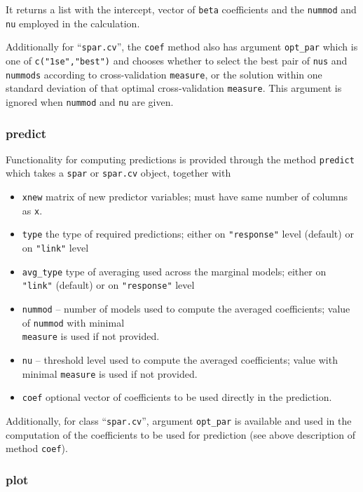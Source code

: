 \documentclass[
  article]{jss}
\begin{document}
It returns a list with the intercept, vector of \texttt{beta}
coefficients and the \texttt{nummod} and \texttt{nu} employed in the
calculation.

Additionally for ``\texttt{spar.cv}'', the \texttt{coef} method also has
argument \texttt{opt\_par} which is one of \texttt{c("1se","best")} and
chooses whether to select the best pair of \texttt{nus} and
\texttt{nummods} according to cross-validation \texttt{measure}, or the
solution within one standard deviation of that optimal cross-validation
\texttt{measure}. This argument is ignored when \texttt{nummod} and
\texttt{nu} are given.

\subsubsection{predict}\label{predict}

Functionality for computing predictions is provided through the method
\texttt{predict} which takes a \texttt{spar} or \texttt{spar.cv} object,
together with

\begin{itemize}
\item
  \texttt{xnew} matrix of new predictor variables; must have same number
  of columns as \texttt{x}.
\item
  \texttt{type} the type of required predictions; either on
  \texttt{"response"} level (default) or on \texttt{"link"} level
\item
  \texttt{avg\_type} type of averaging used across the marginal models;
  either on \texttt{"link"} (default) or on \texttt{"response"} level
\item
  \texttt{nummod} -- number of models used to compute the averaged
  coefficients; value of \texttt{nummod} with minimal\\
  \texttt{measure} is used if not provided.
\item
  \texttt{nu} -- threshold level used to compute the averaged
  coefficients; value with minimal \texttt{measure} is used if not
  provided.
\item
  \texttt{coef} optional vector of coefficients to be used directly in
  the prediction.
\end{itemize}

Additionally, for class ``\texttt{spar.cv}'', argument \texttt{opt\_par}
is available and used in the computation of the coefficients to be used
for prediction (see above description of method \texttt{coef}).

\subsubsection{plot}\label{plot}
\end{document}
